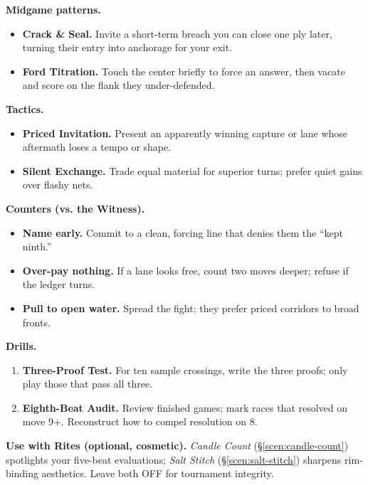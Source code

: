 \documentclass[11pt]{article}
\begin{document}
\begin{itemize}
\medskip
\noindent\textbf{Midgame patterns.}
\begin{itemize}\setlength\itemsep{0.25em}
  \item \textbf{Crack \& Seal.} Invite a short-term breach you can close one ply later, turning their entry into anchorage for your exit.
  \item \textbf{Ford Titration.} Touch the center briefly to force an answer, then vacate and score on the flank they under-defended.
\end{itemize}

\medskip
\noindent\textbf{Tactics.}
\begin{itemize}\setlength\itemsep{0.25em}
  \item \textbf{Priced Invitation.} Present an apparently winning capture or lane whose aftermath loses a tempo or shape.
  \item \textbf{Silent Exchange.} Trade equal material for superior turns; prefer quiet gains over flashy nets.
\end{itemize}

\medskip
\noindent\textbf{Counters (vs. the Witness).}
\begin{itemize}\setlength\itemsep{0.25em}
  \item \textbf{Name early.} Commit to a clean, forcing line that denies them the “kept ninth.”
  \item \textbf{Over-pay nothing.} If a lane looks free, count two moves deeper; refuse if the ledger turns.
  \item \textbf{Pull to open water.} Spread the fight; they prefer priced corridors to broad fronts.
\end{itemize}

\medskip
\noindent\textbf{Drills.}
\begin{enumerate}\setlength\itemsep{0.25em}
  \item \textbf{Three-Proof Test.} For ten sample crossings, write the three proofs; only play those that pass all three.
  \item \textbf{Eighth-Beat Audit.} Review finished games; mark races that resolved on move 9+. Reconstruct how to compel resolution on 8.
\end{enumerate}

\medskip
\noindent\textbf{Use with Rites (optional, cosmetic).} \emph{Candle Count} (\S\ref{scen:candle-count}) spotlights your five-beat evaluations; \emph{Salt Stitch} (\S\ref{scen:salt-stitch}) sharpens rim-binding aesthetics. Leave both \textsc{OFF} for tournament integrity.


\end{itemize}
\end{document}
